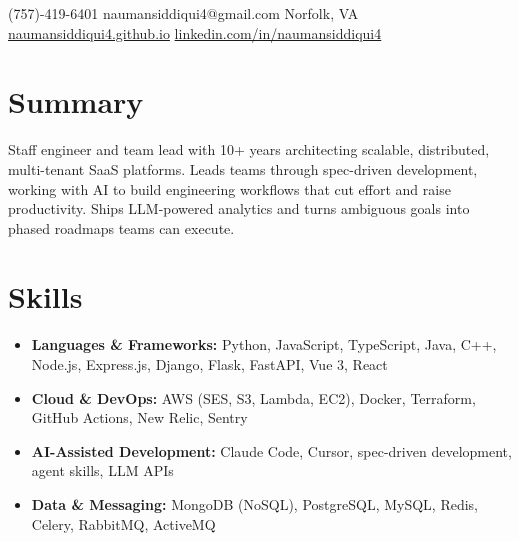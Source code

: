 \documentclass[12pt,a4paper,sans]{moderncv}
\begin{document}
\makecvtitle
\vspace*{-14mm}
\begin{center}
(757)-419-6401 \textbar{} naumansiddiqui4@gmail.com \textbar{} Norfolk, VA\\
{\color{blue}\href{https://naumansiddiqui4.github.io/}{naumansiddiqui4.github.io}} \textbar{} {\color{blue}\href{https://www.linkedin.com/in/naumansiddiqui4/}{linkedin.com/in/naumansiddiqui4}}
\end{center}

\section{Summary}
\justify
Staff engineer and team lead with 10+ years architecting scalable, distributed, multi-tenant SaaS platforms. Leads teams through spec-driven development, working with AI to build engineering workflows that cut effort and raise productivity. Ships LLM-powered analytics and turns ambiguous goals into phased roadmaps teams can execute.
\section{Skills}
\begin{itemize}[label=\textbullet]
\item \textbf{Languages \& Frameworks:} Python, JavaScript, TypeScript, Java, C++, Node.js, Express.js, Django, Flask, FastAPI, Vue 3, React
\item \textbf{Cloud \& DevOps:} AWS (SES, S3, Lambda, EC2), Docker, Terraform, GitHub Actions, New Relic, Sentry
\item \textbf{AI-Assisted Development:} Claude Code, Cursor, spec-driven development, agent skills, LLM APIs
\item \textbf{Data \& Messaging:} MongoDB (NoSQL), PostgreSQL, MySQL, Redis, Celery, RabbitMQ, ActiveMQ
\end{itemize}
\end{document}

